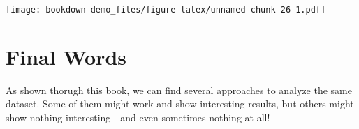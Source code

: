 \documentclass[
]{book}
\newenvironment{Shaded}{\begin{snugshade}}{\end{snugshade}}
\newcommand{\DataTypeTok}[1]{\textcolor[rgb]{0.13,0.29,0.53}{#1}}
\newcommand{\KeywordTok}[1]{\textcolor[rgb]{0.13,0.29,0.53}{\textbf{#1}}}
\newcommand{\NormalTok}[1]{#1}
\newcommand{\OperatorTok}[1]{\textcolor[rgb]{0.81,0.36,0.00}{\textbf{#1}}}
\newcommand{\StringTok}[1]{\textcolor[rgb]{0.31,0.60,0.02}{#1}}
\begin{document}
\begin{Shaded}
\end{Shaded}

\texttt{[image: bookdown-demo\_files/figure-latex/unnamed-chunk-26-1.pdf]}

\hypertarget{final-words}{%
\chapter{Final Words}\label{final-words}}

As shown thorugh this book, we can find several approaches to analyze the same dataset. Some of them might work and show interesting results, but others might show nothing interesting - and even sometimes nothing at all!

  
\end{document}
